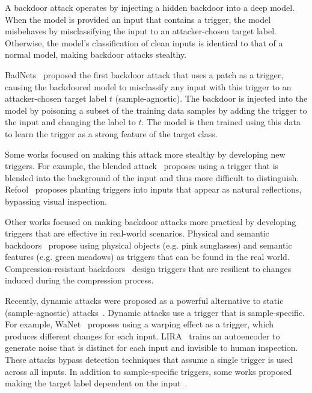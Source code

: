 \documentclass[letterpaper,twocolumn,10pt]{article}
\begin{document}
A backdoor attack operates by injecting a hidden backdoor into a deep model. When the model is provided an input that contains a trigger, the model misbehaves by misclassifying the input to an attacker-chosen target label. Otherwise, the model's classification of clean inputs is identical to that of a normal model, making backdoor attacks stealthy.

BadNets~\cite{gu2017badnets} proposed the first backdoor attack that uses a patch as a trigger, causing the backdoored model to misclassify any input with this trigger to an attacker-chosen target label $t$ (sample-agnostic). The backdoor is injected into the model by poisoning a subset of the training data samples by adding the trigger to the input and changing the label to $t$. The model is then trained using this data to learn the trigger as a strong feature of the target class.

Some works focused on making this attack more stealthy by developing new triggers. For example, the blended attack~\cite{chen2017targeted} proposes using a trigger that is blended into the background of the input and thus more difficult to distinguish. Refool~\cite{liu2020reflect} proposes planting triggers into inputs that appear as natural reflections, bypassing visual inspection.

Other works focused on making backdoor attacks more practical by developing triggers that are effective in real-world scenarios. Physical and semantic backdoors~\cite{li2021rethinking, xue2021facial, fu2023eagle, wenger2021physical} propose using physical objects (e.g. pink sunglasses) and semantic features (e.g. green meadows) as triggers that can be found in the real world. Compression-resistant backdoors~\cite{xue2022resistant} design triggers that are resilient to changes induced during the compression process.

Recently, dynamic attacks were proposed as a powerful alternative to static (sample-agnostic) attacks~\cite{salem2022dynamic}. Dynamic attacks use a trigger that is sample-specific. For example, WaNet~\cite{nguyen2021wanet} proposes using a warping effect as a trigger, which produces different changes for each input. LIRA~\cite{doan2021lira} trains an autoencoder to generate noise that is distinct for each input and invisible to human inspection. These attacks bypass detection techniques that assume a single trigger is used across all inputs. In addition to sample-specific triggers, some works proposed making the target label dependent on the input~\cite{kwon2022multi}. 
\end{document}
